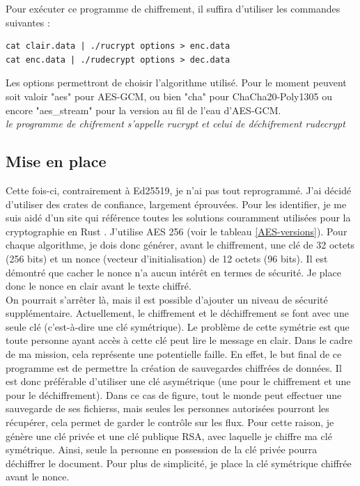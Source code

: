 \documentclass[a4paper, 12pt]{article}
\begin{document}
Pour exécuter ce programme de chiffrement, il suffira d'utiliser les commandes suivantes : 
\begin{verbatim}
cat clair.data | ./rucrypt options > enc.data
cat enc.data | ./rudecrypt options > dec.data
\end{verbatim}
Les options permettront de choisir l'algorithme utilisé. Pour le moment peuvent soit valoir "aes" pour AES-GCM, ou bien "cha" pour ChaCha20-Poly1305 ou encore "aes\_stream" pour la version au fil de l'eau d'AES-GCM.\\


\noindent\emph{le programme de chifrement s'appelle rucrypt et celui de déchifrement rudecrypt}

\subsection{Mise en place}
Cette fois-ci, contrairement à Ed25519, je n'ai pas tout reprogrammé. J'ai décidé d'utiliser des crates de confiance, largement éprouvées. Pour les identifier, je me suis aidé d'un site qui référence toutes les solutions couramment utilisées pour la cryptographie en Rust \cite{bddrustcrypto}. J'utilise AES 256 (voir le tableau \ref{AES-versions}). Pour chaque algorithme, je dois donc générer, avant le chiffrement, une clé de 32 octets (256 bits) et un nonce (vecteur d'initialisation) de 12 octets (96 bits). Il est démontré que cacher le nonce n'a aucun intérêt en termes de sécurité. Je place donc le nonce en clair avant le texte chiffré. \\

On pourrait s'arrêter là, mais il est possible d'ajouter un niveau de sécurité supplémentaire. Actuellement, le chiffrement et le déchiffrement se font avec une seule clé (c'est-à-dire une clé symétrique). Le problème de cette symétrie est que toute personne ayant accès à cette clé peut lire le message en clair. Dans le cadre de ma mission, cela représente une potentielle faille. En effet, le but final de ce programme est de permettre la création de sauvegardes chiffrées de données. Il est donc préférable d'utiliser une clé asymétrique (une pour le chiffrement et une pour le déchiffrement). Dans ce cas de figure, tout le monde peut effectuer une sauvegarde de ses fichierss, mais seules les personnes autorisées pourront les récupérer, cela permet de garder le contrôle sur les flux. Pour cette raison, je génère une clé privée et une clé publique RSA, avec laquelle je chiffre ma clé symétrique. Ainsi, seule la personne en possession de la clé privée pourra déchiffrer le document. Pour plus de simplicité, je place la clé symétrique chiffrée avant le nonce.
\end{document}
